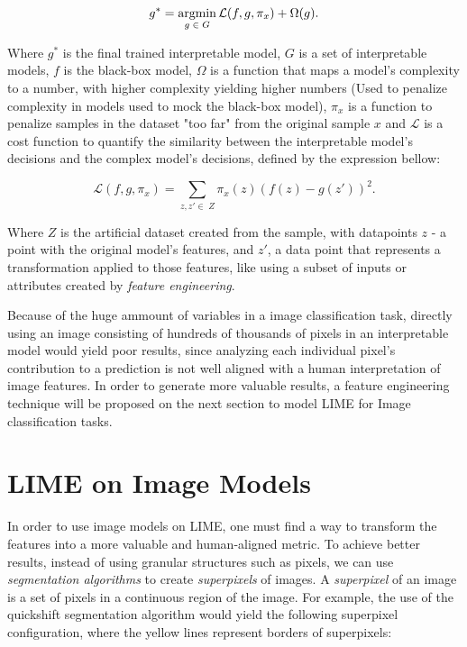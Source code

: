 \begin{equation}
    g^* = \operatorname*{argmin}_{g \;\in\; G} \mathcal{L}(f, g, \pi_x) + \Omega(g).
    \label{eq:lime_optimization}  
\end{equation}

Where \(g^*\) is the final trained interpretable model, 
\(G\) is a set of interpretable models, \(f\) is the black-box model, 
\(\Omega\) is a function that maps a model's complexity to a number, with higher complexity yielding higher numbers (Used to penalize complexity in models used to mock the black-box model),
\(\pi_x\) is a function to penalize samples in the dataset "too far" from the original sample \(x\) and
\(\mathcal{L}\) is a cost function to quantify the similarity between the interpretable model's decisions and the complex model's decisions, defined by the expression bellow:

\begin{equation}
    \mathcal{L}(f, g, \pi_x) = \sum_{z, z' \in \; Z} \pi_x(z) (f(z) - g(z'))^2.
    \label{eq:lime_loss}  
\end{equation}

Where \(Z\) is the artificial dataset created from the sample, with datapoints \(z\) - a point with the original model's features, and \(z'\), a data point that represents a transformation applied to those features, like using a subset of inputs or attributes created by \emph{feature engineering}.

Because of the huge ammount of variables in a image classification task, directly using an image consisting of hundreds of thousands of pixels in an interpretable model would yield poor results, since analyzing each individual pixel's contribution to a prediction is not well aligned with a human interpretation of image features.
In order to generate more valuable results, a feature engineering technique will be proposed on the next section to model LIME for Image classification tasks. 

\section{LIME on Image Models}

In order to use image models on LIME, one must find a way to transform the features into a more valuable and human-aligned metric. 
To achieve better results, instead of using granular structures such as pixels, we can use \emph{segmentation algorithms} to create \emph{superpixels} of images.
A \emph{superpixel} of an image is a set of pixels in a continuous region of the image. 
For example, the use of the quickshift segmentation algorithm would yield the following superpixel configuration, where the yellow lines represent borders of superpixels:

